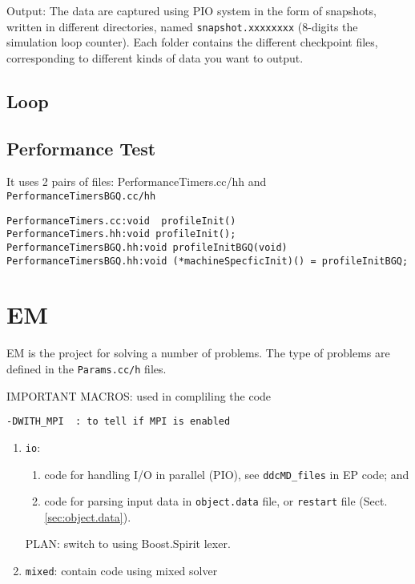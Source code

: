 Output: The data are captured using PIO system in the form of  snapshots,
written in different directories, named \verb!snapshot.xxxxxxxx! (8-digits  the
simulation loop counter). Each folder contains the different checkpoint  files,
corresponding to different kinds of data you want to output.   
  


\subsection{Loop}
\label{sec:EP_loop}

\subsection{Performance Test}
\label{sec:EP_performanceTest}

It uses 2 pairs of files: PerformanceTimers.cc/hh and
\verb!PerformanceTimersBGQ.cc/hh!
\begin{verbatim}
PerformanceTimers.cc:void  profileInit()
PerformanceTimers.hh:void profileInit();
PerformanceTimersBGQ.hh:void profileInitBGQ(void)
PerformanceTimersBGQ.hh:void (*machineSpecficInit)() = profileInitBGQ; 
\end{verbatim}


\section{EM}	
\label{sec:EM}

EM is the project for solving a number of problems. The type of problems are
defined in the \verb!Params.cc/h! files.
 
IMPORTANT MACROS: used in compliling the code
\begin{verbatim}
-DWITH_MPI  : to tell if MPI is enabled
\end{verbatim}

\begin{enumerate}
  \item \verb!io!: 
  \begin{enumerate}
    \item  code for handling I/O in parallel (PIO), see
  \verb!ddcMD_files! in EP code; and 
    \item code for parsing input data in \verb!object.data!
  file, or \verb!restart! file (Sect.\ref{sec:object.data}). 
  \end{enumerate}
PLAN: switch to using Boost.Spirit lexer.  
  
  \item \verb!mixed!: contain code using mixed solver
  
\end{enumerate}


